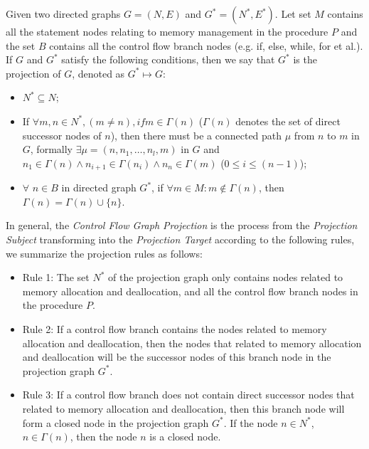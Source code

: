 \begin{definition}
Given two directed graphs $G = (N, E)$ and $G^* = (N^*, E^*)$. Let set $M$ contains all the statement nodes relating to memory management in the procedure $P$ and the set $B$ contains all the control flow branch nodes (e.g. {\sf if}, {\sf else}, {\sf while}, {\sf for} et al.). If $G$ and $G^*$ satisfy the following conditions, then we say that $G^*$ is the projection of $G$, denoted as $G^* \mapsto G$:
\begin{itemize}
\item
$N^*\subseteq N$;
\item
If $\forall m,n\in N^*,(m\neq n), if m\in \Gamma(n)$ ($\Gamma(n)$ denotes the set of direct successor nodes of $n$), then there must be a connected path $\mu$ from $n$ to $m$ in $G$, formally $\exists \mu=(n, n_1,\ldots,n_l,m)$ in $G$ and $n_1\in\Gamma(n) \land  n_{i+1}\in\Gamma(n_i) \land n_n\in \Gamma(m)$ ($0\leq i\leq (n-1)$);
\item
$\forall$ $n\in B$ in directed graph $G^*$, if $\forall m\in M: m\not\in \Gamma(n)$, then $\Gamma(n)=\Gamma(n)\cup\{n\}$. 
\end{itemize}
\end{definition}

In general, the \emph{Control Flow Graph Projection} is the process from the \emph{Projection Subject} transforming into the \emph{Projection Target} according to the following rules, we summarize the projection rules as follows: 
\begin{itemize}
\item 
Rule 1: The set $N^*$ of the projection graph only contains nodes related to memory allocation and deallocation, and all the control flow branch nodes in the procedure $P$.
\item
Rule 2: If a control flow branch contains the nodes related to memory allocation and deallocation, then the nodes that related to memory allocation and deallocation will be the successor nodes of this branch node in the projection graph $G^*$.
\item
Rule 3: If a control flow branch does not contain direct successor nodes that related to memory allocation and deallocation, then this branch node will form a closed node in the projection graph $G^*$. 
If the node $n\in N^*$, $n\in \Gamma(n)$, then the node $n$ is a closed node.
\end{itemize}



